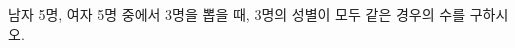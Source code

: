 \hspace*{2mm}\begin{minipage}[t]{\dimexpr\linewidth-2mm\relax}\vspace{0pt}
남자 5명, 여자 5명 중에서 3명을 뽑을 때, 3명의 성별이 모두 같은 경우의 수를 구하시오.\end{minipage}

